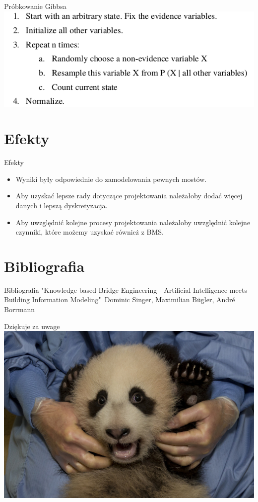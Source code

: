 \documentclass[10pt]{beamer}
\begin{document}
\begin{frame}{Próbkowanie Gibbsa}
\includegraphics[scale=0.5]{Gibs.png}
\end{frame}

\section{Efekty}
\begin{frame}{Efekty}
\begin{itemize}
\item Wyniki były odpowiednie do zamodelowania pewnych mostów.
\item Aby uzyskać lepsze rady dotyczące projektowania należałoby dodać więcej danych i lepszą dyskretyzacja.
\item Aby uwzględnić kolejne procesy projektowania należałoby
uwzględnić kolejne czynniki, które możemy uzyskać również z BMS. 
\end{itemize}
\end{frame}



\section{Bibliografia}
\begin{frame}{Bibliografia}
"Knowledge based Bridge Engineering - Artificial Intelligence meets Building Information Modeling"\ Dominic Singer, Maximilian Bügler, André Borrmann	
\end{frame}


\begin{frame}{}
\begin{center}
\LARGE Dziękuje za uwage
\includegraphics[scale=0.25]{Panda.jpg}
\end{center}
\end{frame}
\end{document}
